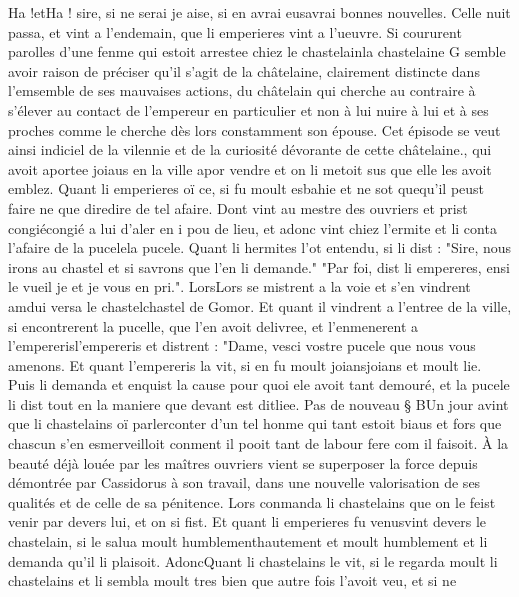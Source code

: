 \documentclass{article}
\begin{document}
\begin{pages}
      Ha !etHa ! 
      sire, si ne serai je aise,
      si en avrai eusavrai bonnes nouvelles. \pend
\pstart Celle nuit passa, et vint a l’endemain, que li emperieres 
    vint a l’ueuvre. Si coururent parolles d’une fenme qui estoit arrestee chiez 
   le chastelainla chastelaine
   G semble avoir raison de préciser qu'il s'agit de la châtelaine, clairement distincte dans l'emsemble 
   de ses mauvaises actions, du châtelain qui cherche au contraire à s'élever au contact de l'empereur en particulier et non à lui
   nuire à lui et à ses proches comme le cherche dès lors constamment son épouse. Cet épisode se veut ainsi indiciel de la 
   vilennie et de la curiosité dévorante de cette châtelaine., 
   qui avoit aportee joiaus en la ville 
   apor vendre et on li metoit sus que elle les avoit emblez. 
   Quant li emperieres oï ce, si fu moult esbahie et ne sot 
   quequ'il peust faire ne que 
   diredire de tel afaire. Dont vint au mestre des ouvriers
   et prist congiécongié a lui d’aler en i pou de lieu, 
   et adonc vint chiez l’ermite et li conta l’afaire de 
   la pucelela pucele.
      Quant li hermites l'ot entendu, si li dist : "Sire, nous irons au chastel et si savrons que l'en li demande."
   "Par foi, dist li empereres, ensi le vueil je et je vous en pri.". 
   LorsLors se mistrent a la voie et s’en vindrent 
   amdui 
   versa 
   le chastelchastel de Gomor.
   Et quant il vindrent a l’entree de la ville, si encontrerent 
   la pucelle, que l’en avoit delivree, et l’enmenerent a 
   l’empererisl'empereris et distrent : 
   "Dame, vesci vostre pucele que nous vous amenons. Et quant l’empereris la vit, 
   si en fu moult joiansjoians et moult lie. Puis li demanda et enquist la cause pour quoi
      ele avoit tant demouré, et la pucele li dist tout en la maniere que devant est ditliee. \pend
\pstart Pas de nouveau § BUn jour avint que 
   li chastelains oï 
   parlerconter d’un tel honme qui tant estoit 
      biaus et fors que chascun s’en esmerveilloit conment il pooit tant de labour fere com il faisoit. 
   À la beauté déjà louée par les maîtres ouvriers vient se superposer la force depuis démontrée par Cassidorus
   à son travail, dans une nouvelle valorisation de ses qualités et de celle de sa pénitence. Lors conmanda 
   li chastelains que on le feist venir par devers lui, et on si 
   fist. Et quant li emperieres fu venusvint 
   devers le chastelain, si le salua moult 
   humblementhautement et moult humblement et li demanda 
   qu’il li plaisoit. 
   AdoncQuant li chastelains le vit, si le regarda moult 
   li chastelains 
   et li sembla moult tres bien que autre fois l’avoit veu, et si ne 

\end{pages}
\end{document}
